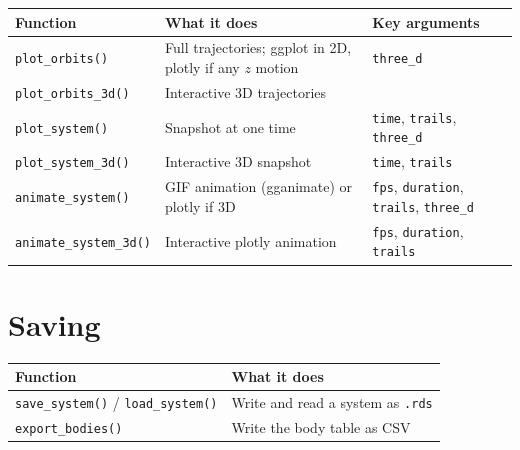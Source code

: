 \documentclass[
  10.5pt,
  letterpaper,
]{scrbook}
\newcounter{none} %
\theoremstyle{definition}
\theoremstyle{plain}
\theoremstyle{remark}
\begin{document}
{\def\LTcaptype{none} %
\begin{longtable}[]{@{}
  >{\raggedright\arraybackslash}p{}
  >{\raggedright\arraybackslash}p{}
  >{\raggedright\arraybackslash}p{}@{}}
\toprule\noalign{}
\begin{minipage}[b]{\linewidth}\raggedright
Function
\end{minipage} & \begin{minipage}[b]{\linewidth}\raggedright
What it does
\end{minipage} & \begin{minipage}[b]{\linewidth}\raggedright
Key arguments
\end{minipage} \\
\midrule\noalign{}
\endhead
\bottomrule\noalign{}
\endlastfoot
\texttt{plot\_orbits()} & Full trajectories; ggplot in 2D, plotly if any
\(z\) motion & \texttt{three\_d} \\
\texttt{plot\_orbits\_3d()} & Interactive 3D trajectories & \\
\texttt{plot\_system()} & Snapshot at one time & \texttt{time},
\texttt{trails}, \texttt{three\_d} \\
\texttt{plot\_system\_3d()} & Interactive 3D snapshot & \texttt{time},
\texttt{trails} \\
\texttt{animate\_system()} & GIF animation (gganimate) or plotly if 3D &
\texttt{fps}, \texttt{duration}, \texttt{trails}, \texttt{three\_d} \\
\texttt{animate\_system\_3d()} & Interactive plotly animation &
\texttt{fps}, \texttt{duration}, \texttt{trails} \\
\end{longtable}
}

\section{Saving}\label{saving}

{\def\LTcaptype{none} %
\begin{longtable}[]{@{}
  >{\raggedright\arraybackslash}p{}
  >{\raggedright\arraybackslash}p{}@{}}
\toprule\noalign{}
\begin{minipage}[b]{\linewidth}\raggedright
Function
\end{minipage} & \begin{minipage}[b]{\linewidth}\raggedright
What it does
\end{minipage} \\
\midrule\noalign{}
\endhead
\bottomrule\noalign{}
\endlastfoot
\texttt{save\_system()} / \texttt{load\_system()} & Write and read a
system as \texttt{.rds} \\
\texttt{export\_bodies()} & Write the body table as CSV \\
\end{longtable}
}
\end{document}
